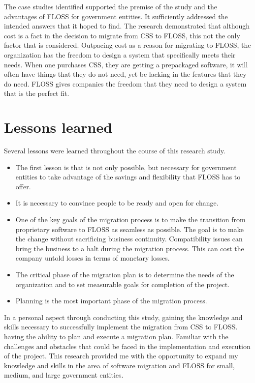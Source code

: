 The case studies identified supported the premise of the study and the advantages of FLOSS for government entities. It sufficiently addressed the intended answers that it hoped to find. The research demonstrated that although cost is a fact in the decision to migrate from CSS to FLOSS, this not the only factor that is considered. Outpacing cost as a reason for migrating to FLOSS, the organization has the freedom to design a system that specifically meets their needs. When one purchases CSS, they are getting a prepackaged  software, it will often have things that they do not need, yet be lacking in the features that they do need. FLOSS gives companies the freedom that they need to design a system that is the perfect fit.          
\section{Lessons learned}
\label{sec:lessons}
Several lessons were learned throughout the course of this research study. 
\begin{itemize}[itemsep=0ex]
\item  The first lesson is that is not only possible, but necessary for government entities to take advantage of the savings and flexibility that FLOSS has to offer.
\item It is necessary to convince people to be ready and open for change.
\item One of the key goals of the migration process is to make the transition from proprietary software to FLOSS as seamless as possible. The goal is to make the change without sacrificing business continuity. Compatibility issues can bring the business to a halt during the migration process. This can cost the company untold losses in terms of monetary losses.
\item The critical phase of the migration plan is to determine the needs of the organization and to set measurable goals for completion of the project.
\item Planning is the most important phase of the migration process.

\end{itemize}

In a personal aspect through conducting this study, gaining the knowledge and skills necessary to successfully implement the migration from CSS to FLOSS. having the ability to plan and execute a migration plan. Familiar with the challenges and obstacles that could be faced in the implementation and execution of the project. 
This research provided me with the opportunity to expand my knowledge and skills in the area of software migration and FLOSS for small, medium, and large government entities.

